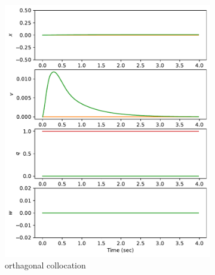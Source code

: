 \documentclass[]{article}
\begin{document}
\begin{figure}[H]
	\centering
	\begin{subfigure}[b]{0.3\textwidth}
		\centering
		\includegraphics[width=\textwidth]{statehover1.pdf}
		\caption{orthagonal collocation}
	\end{subfigure}%
	\begin{subfigure}[b]{0.3\textwidth}
		\centering

\end{subfigure}
\end{figure}
\end{document}
